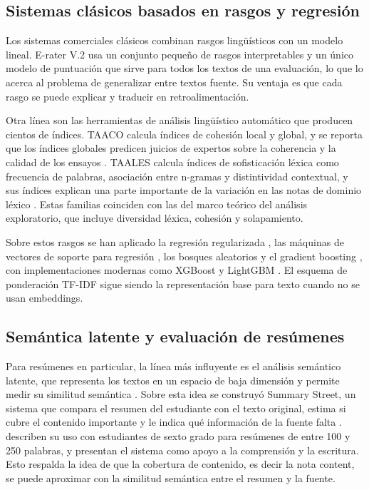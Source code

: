 \documentclass[11pt,a4paper]{article}
\begin{document}
\subsection{Sistemas clásicos basados en rasgos y regresión}

Los sistemas comerciales clásicos combinan rasgos lingüísticos con un modelo lineal. E-rater V.2 \citep{attali2006} usa un conjunto pequeño de rasgos interpretables y un único modelo de puntuación que sirve para todos los textos de una evaluación, lo que lo acerca al problema de generalizar entre textos fuente. Su ventaja es que cada rasgo se puede explicar y traducir en retroalimentación.

Otra línea son las herramientas de análisis lingüístico automático que producen cientos de índices. TAACO calcula índices de cohesión local y global, y se reporta que los índices globales predicen juicios de expertos sobre la coherencia y la calidad de los ensayos \citep{crossley2016}. TAALES calcula índices de sofisticación léxica como frecuencia de palabras, asociación entre n-gramas y distintividad contextual, y sus índices explican una parte importante de la variación en las notas de dominio léxico \citep{kyle2018}. Estas familias coinciden con las del marco teórico del análisis exploratorio, que incluye diversidad léxica, cohesión y solapamiento.

Sobre estos rasgos se han aplicado la regresión regularizada \citep{hoerl1970}, las máquinas de vectores de soporte para regresión \citep{cortes1995,smola2004}, los bosques aleatorios \citep{breiman2001} y el gradient boosting \citep{friedman2001}, con implementaciones modernas como XGBoost \citep{chen2016} y LightGBM \citep{ke2017}. El esquema de ponderación TF-IDF \citep{salton1988} sigue siendo la representación base para texto cuando no se usan embeddings.

\subsection{Semántica latente y evaluación de resúmenes}

Para resúmenes en particular, la línea más influyente es el análisis semántico latente, que representa los textos en un espacio de baja dimensión y permite medir su similitud semántica \citep{landauer1998}. Sobre esta idea se construyó Summary Street, un sistema que compara el resumen del estudiante con el texto original, estima si cubre el contenido importante y le indica qué información de la fuente falta \citep{kintsch2000}. \citet{wade2004} describen su uso con estudiantes de sexto grado para resúmenes de entre 100 y 250 palabras, y \citet{franzke2005} presentan el sistema como apoyo a la comprensión y la escritura. Esto respalda la idea de que la cobertura de contenido, es decir la nota content, se puede aproximar con la similitud semántica entre el resumen y la fuente.
\end{document}
